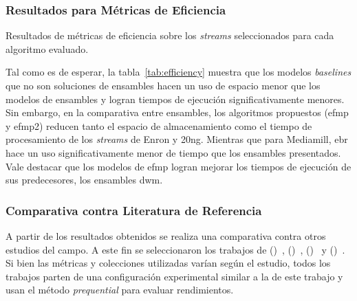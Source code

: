 \subsubsection{Resultados para Métricas de Eficiencia}

\begin{table}[htbp]
	\centering
	\begin{adjustbox}{max width=\textwidth}
		
	\end{adjustbox}
	\caption{Resultados de métricas de eficiencia sobre los
		\textit{streams} seleccionados para cada algoritmo evaluado.}
	\label{tab:efficiency}
\end{table}

Tal como es de esperar, la tabla~\ref{tab:efficiency} muestra que los modelos
\textit{baselines} que no son soluciones de ensambles hacen un uso de espacio
menor que los modelos de ensambles y logran tiempos de ejecución
significativamente menores. Sin embargo, en la comparativa entre ensambles, los
algoritmos propuestos (\acrshort{efmp} y \acrshort{efmp2}) reducen tanto el
espacio de almacenamiento como el tiempo de procesamiento de los
\textit{streams} de Enron y 20ng. Mientras que para Mediamill, \acrshort{ebr}
hace un uso significativamente menor de tiempo que los ensambles presentados.
Vale destacar que los modelos de \acrshort{efmp} logran mejorar los tiempos de
ejecución de sus predecesores, los ensambles \acrshort{dwm}.

\subsubsection{Comparativa contra Literatura de Referencia}

A partir de los resultados obtenidos se realiza una comparativa contra otros
estudios del campo. A este fin se seleccionaron los trabajos de
\citeauthor{osojnik_multi-label_2017}
(\citeyear{osojnik_multi-label_2017})~\cite{osojnik_multi-label_2017},
\citeauthor{roseberry_multi-label_2018}
(\citeyear{roseberry_multi-label_2018})~\cite{roseberry_multi-label_2018},
\citeauthor{buyukcakir_novel_2018}
(\citeyear{buyukcakir_novel_2018})~\cite{buyukcakir_novel_2018} y
\citeauthor{sousa_multi-label_2018}
(\citeyear{sousa_multi-label_2018})~\cite{sousa_multi-label_2018}. Si bien las
métricas y colecciones utilizadas varían según el estudio, todos los trabajos
parten de una configuración experimental similar a la de este trabajo y usan el
método \textit{prequential} para evaluar rendimientos.

